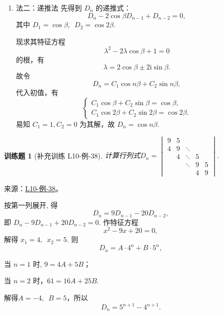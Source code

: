 \documentclass[UTF8,12pt,a4paper,fontset=fandol]{ctexart}
\newtheorem{exercise}{训练题}[section]
\begin{document}
\begin{solve}
\begin{enumerate}
            则证得$D_n=\cos n\beta,\enspace n\in \mathbf{N}$.

        \item 法二：递推法
            先得到 $D_n$ 的递推式：
            \[
                D_n - 2 \cos \beta D_{n-1} + D_{n-2} = 0,
            \]
            其中 $D_1 = \cos \beta, \enspace D_2 = \cos 2\beta$.

            现求其特征方程
            \[
                \lambda^2 - 2 \lambda \cos \beta + 1 = 0
            \]
            的根，有
            \[
                \lambda = 2 \cos \beta \pm 2 \mathrm{i} \sin \beta.
            \]
            故令
            \[
                D_n = C_1 \cos n\beta + C_2 \sin n\beta,
            \]
            代入初值，有
            \[
                \begin{cases}
                    C_1 \cos \beta + C_2 \sin \beta = \cos \beta, \\
                    C_1 \cos 2\beta + C_2 \sin 2\beta = \cos 2\beta.
                \end{cases}
            \]
            易知 $C_1 = 1, C_2 = 0$ 为其解，故 $D_n = \cos n\beta$.
    \end{enumerate}
\end{solve}

\begin{exercise}[补充训练 L10-例-38]\label{prob:L10-例-38}
计算行列式$D_n=
        \begin{vmatrix}
            9 & 5 &        &   &   \\
            4 & 9 & \ddots &   &   \\
              & 4 & \ddots & 5 &   \\
              &   & \ddots & 9 & 5 \\
              &   &        & 4 & 9
        \end{vmatrix}$.
\end{exercise}
\noindent 来源：\href{https://github.com/yhwu-is/Linear-Algebra-Left-Undone/blob/new/%E8%AE%B2%E4%B9%89/%E4%B8%93%E9%A2%98/10%20%E8%A1%8C%E5%88%97%E5%BC%8F.tex}{L10-例-38}。
\begin{solve}
按第一列展开, 得
    \[ D_n=9 D_{n-1}-20 D_{n-2}, \]
    即 $ D_n-9 D_{n-1}+20 D_{n-2}=0 $.
    作特征方程
    \[ x^{2}-9 x+20=0, \]
    解得 $ x_1=4,\enspace x_2=5 $. 则
    \[ D_n=A \cdot 4^n+B \cdot 5^n, \]

    当 $n=1$ 时, $9=4A+5B$；

    当 $n=2$ 时，$61=16A+25B$.

    解得$A=-4,\enspace B=5$，所以
    \[ D_n=5^{n+1}-4^{n+1}. \]
\end{solve}
\end{document}
